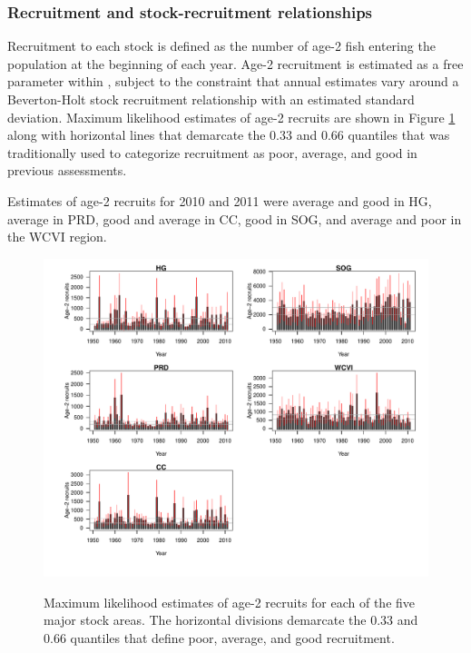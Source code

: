 \subsubsection{Recruitment and stock-recruitment relationships}

Recruitment to each stock is defined as the number of age-2 fish entering the population at the beginning of each year. Age-2 recruitment is estimated as a free parameter within \iscam, subject to the constraint that annual estimates vary around a Beverton-Holt stock recruitment relationship with an estimated standard deviation.  Maximum likelihood estimates of age-2 recruits are shown in Figure \ref{PartII:Results:FigAge2Recruits} along with horizontal lines that demarcate the 0.33 and 0.66 quantiles that was traditionally used to categorize recruitment as poor, average, and good in previous assessments.

Estimates of age-2 recruits for 2010 and 2011 were average and good  in HG, average in PRD, good and average in CC, good in SOG, and average and poor in the WCVI region.


\begin{figure}[!tbp]
	\includegraphics[width=\textwidth]{../FIGS/qPriorFigs/iscam_fig_recruitment.pdf}\\
	\caption{Maximum likelihood estimates of age-2 recruits for each of the five major stock areas.  The horizontal divisions demarcate the 0.33 and 0.66 quantiles that define poor, average, and good recruitment.}\label{PartII:Results:FigAge2Recruits}
\end{figure}

